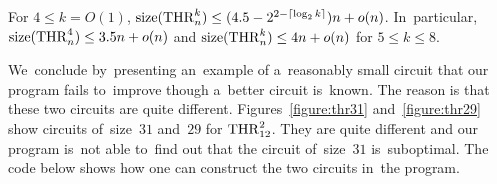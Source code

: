 \begin{corollary}
	For $4 \le k =O(1)$, $\operatorname{size}(\operatorname{THR}_n^k) \le (4.5-2^{2-{{\lceil \log_2k \rceil}}})n+o(n)$. In~particular, $\operatorname{size}(\operatorname{THR}_n^4) \le 3.5n+o(n)$ and 
	$\operatorname{size}(\operatorname{THR}_n^k) \le 4n+o(n)$ for $5 \le k \le 8$.
\end{corollary}


We~conclude by~presenting an~example of a~reasonably small circuit
that our program fails to~improve though a~better circuit
is~known. The reason is that these two circuits are quite
different.
Figures~\ref{figure:thr31} and~\ref{figure:thr29} show circuits of~size~$31$ and~$29$ for $\operatorname{THR}_{12}^2$.
They are
quite different and our program is~not able to~find out
that the circuit
of~size~$31$ is~suboptimal.
The code below shows how one 
can construct the two circuits in~the program.

\inputminted[firstline=90,lastline=96]{python}{../tutorial.py}

